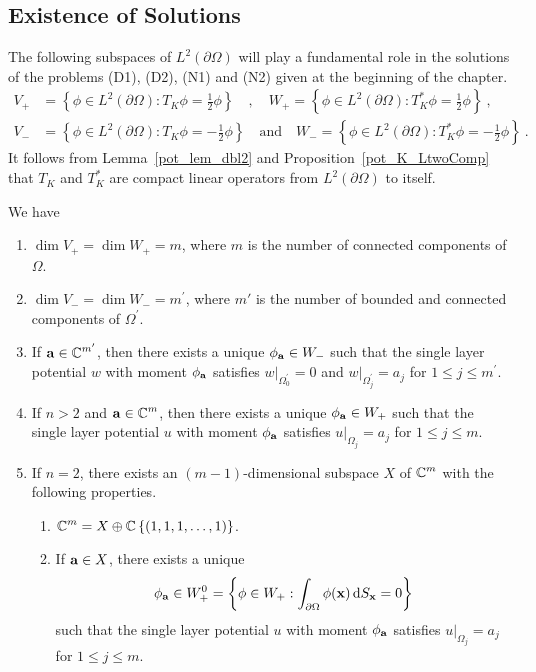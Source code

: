 \subsection{Existence of Solutions}

The following subspaces of $\displaystyle L^2(\partial \Omega)$ will play a
fundamental role in the solutions of the problems (D1), (D2), (N1) and
(N2) given at the beginning of the chapter.
\begin{align*}
V_+ &= \left\{ \phi \in L^2(\partial \Omega) : T_K \phi = \frac{1}{2}
\phi \right\} \quad , \quad
W_+ = \left\{ \phi \in L^2(\partial \Omega) : T_K^\ast \phi = \frac{1}{2}
\phi \right\} \ , \\
V_- &= \left\{ \phi \in L^2(\partial \Omega) : T_K \phi = - \frac{1}{2}
\phi \right\} \quad \text{and} \quad
W_- = \left\{ \phi \in L^2(\partial \Omega) : T_K^\ast \phi = -\frac{1}{2}
\phi \right\} \ .
\end{align*}
It follows from Lemma~\ref{pot_lem_dbl2} and
Proposition~\ref{pot_K_LtwoComp} that $T_K$ and
$\displaystyle T_K^\ast$ are compact
linear operators from $\displaystyle L^2(\partial \Omega)$ to itself.

\begin{prop} \label{pot_split_prop}
We have
\begin{enumerate}
\item $\dim V_+ = \dim W_+ = m$, where $m$ is the number of connected
components of $\Omega$.
\item $\displaystyle \dim V_- = \dim W_- = m^{\prime}$, where $m'$ is
the number of bounded and connected components of
$\displaystyle \Omega^{\prime}$.
\item If $\displaystyle \mathbf{a} \in \mathbb{C}^{m^{\prime}}$, then there
exists a unique $\phi_{\mathbf{a}} \in W_-$ such that the single layer
potential $w$ with moment $\phi_{\mathbf{a}}$ satisfies
$\displaystyle w\big|_{\Omega_0^{\prime}}=0$ and
$\displaystyle w\big|_{\Omega_j^{\prime}} = a_j$ for
$1 \leq j \leq m^{\prime}$.
\item If $n>2$ and $\displaystyle \mathbf{a} \in \mathbb{C}^m$, then there
exists a unique $\phi_{\mathbf{a}} \in W_+$ such that the single layer
potential $u$ with moment $\phi_{\mathbf{a}}$ satisfies
$\displaystyle u\big|_{\Omega_j} = a_j$
for $1 \leq j \leq m$.
\item If $n=2$, there exists an $(m-1)$-dimensional subspace $X$ of
$\displaystyle \mathbb{C}^m$ with the following properties.
\begin{enumerate}
\item $\displaystyle \mathbb{C}^m = X \oplus \mathbb{C}\left\{(1,1,1,\ldots,1)\right\}$.
\item If $\mathbf{a}\in X$, there exists a unique
\[
\phi_{\mathbf{a}} \in W_+^0 = \left\{ \phi \in W_+ :
\int_{\partial \Omega} \phi(\mathbf{x}) \,\mathrm{d}{S}_{\mathbf{x}} = 0 \right\}
\]
such that the single layer potential $u$ with moment $\phi_{\mathbf{a}}$
satisfies $\displaystyle u\big|_{\Omega_j} = a_j$
for $1 \leq j \leq m$.
\end{enumerate}
\end{enumerate}
\end{prop}

